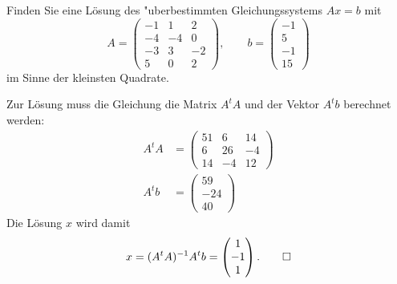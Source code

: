 Finden Sie eine Lösung des "uberbestimmten Gleichungssystems $Ax=b$ mit 
\[
A=\begin{pmatrix}
-1& 1& 2\\
-4&-4& 0\\
-3& 3&-2\\
 5& 0& 2
\end{pmatrix},
\qquad
b=\begin{pmatrix}
-1\\5\\-1\\15
\end{pmatrix}
\]
im Sinne der kleinsten Quadrate.


\begin{loesung}
Zur Lösung muss die Gleichung die Matrix $A^tA$ und der Vektor $A^tb$
berechnet werden:
\begin{align*}
A^tA
&=
\begin{pmatrix}
   51 &  6 & 14 \\
    6 & 26 & -4 \\
   14 & -4 & 12
\end{pmatrix}
\\
A^tb
&=
\begin{pmatrix}
59\\-24\\40
\end{pmatrix}
\end{align*}
Die Lösung $x$ wird damit
\[
x
=
(A^tA)^{-1} A^tb
=
\begin{pmatrix} 1\\-1\\1 \end{pmatrix}.\qedhere
\]
\end{loesung}


